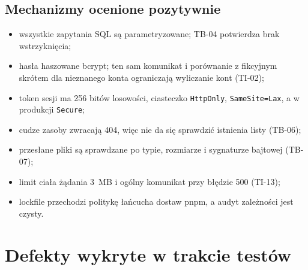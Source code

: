 \documentclass[a4paper,11pt]{article}
\newcommand{\code}[1]{\texttt{\small #1}}
\begin{document}
\subsection{Mechanizmy ocenione pozytywnie}
\begin{itemize}
  \item wszystkie zapytania SQL są parametryzowane; TB-04 potwierdza brak wstrzyknięcia;
  \item hasła haszowane bcrypt; ten sam komunikat i porównanie z fikcyjnym skrótem dla
        nieznanego konta ograniczają wyliczanie kont (TI-02);
  \item token sesji ma 256 bitów losowości, ciasteczko \code{HttpOnly}, \code{SameSite=Lax},
        a w produkcji \code{Secure};
  \item cudze zasoby zwracają 404, więc nie da się sprawdzić istnienia listy (TB-06);
  \item przesłane pliki są sprawdzane po typie, rozmiarze i sygnaturze bajtowej (TB-07);
  \item limit ciała żądania 3~MB i ogólny komunikat przy błędzie 500 (TI-13);
  \item lockfile przechodzi politykę łańcucha dostaw pnpm, a audyt zależności jest czysty.
\end{itemize}

\section{Defekty wykryte w trakcie testów}
\end{document}
